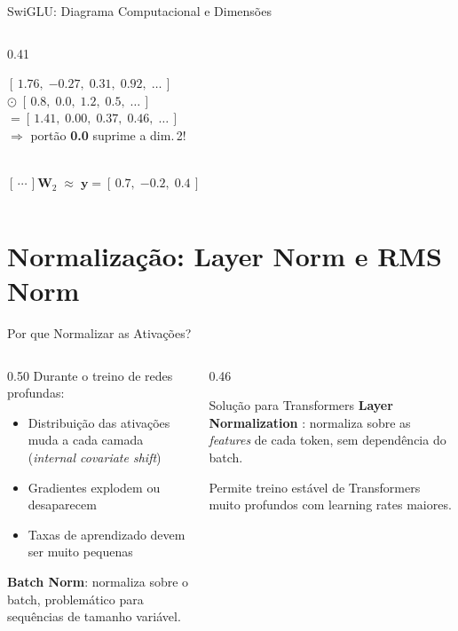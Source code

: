 \documentclass[aspectratio=169, xcolor=dvipsnames]{beamer}
\begin{document}
\begin{frame}{SwiGLU: Diagrama Computacional e Dimensões}
\begin{columns}[T]
\begin{column}{0.41\textwidth}
        \colorbox{PastelOrange}{%
          \begin{minipage}{0.88\linewidth}
            \scriptsize
            $[\,1.76,\;{-0.27},\;0.31,\;0.92,\;\ldots\,]$\\
            $\odot\;[\,0.8,\;\mathbf{0.0},\;1.2,\;0.5,\;\ldots\,]$\\[0.15em]
            $=[\,1.41,\;\mathbf{0.00},\;0.37,\;0.46,\;\ldots\,]$\\[0.2em]
            \textcolor{red!70!black}{\tiny$\Rightarrow$ portão \textbf{0.0} suprime a dim.\,2!}
          \end{minipage}%
        }\\[0.6em]

        {\setlength{\fboxsep}{3pt}%
        \colorbox{CellYellow}{$[\,\cdots\,]\mathbf{W}_2\;\approx\;\mathbf{y} = [\,0.7,\;{-0.2},\;0.4\,]$}
        }
      \end{column}
    \end{columns}
  \end{frame}

  \section{Normalização: Layer Norm e RMS Norm}

  \begin{frame}{Por que Normalizar as Ativações?}
    \begin{columns}[T]
      \begin{column}{0.50\textwidth}
        Durante o treino de redes profundas:
        \begin{itemize}
          \item Distribuição das ativações muda a cada camada (\textit{internal covariate shift})
          \item Gradientes explodem ou desaparecem
          \item Taxas de aprendizado devem ser muito pequenas
        \end{itemize}
        \vspace{0.4em}
        \textbf{Batch Norm}: normaliza sobre o batch, problemático para sequências de tamanho variável.
      \end{column}
      \begin{column}{0.46\textwidth}
        \begin{block}{Solução para Transformers}
          \textbf{Layer Normalization} \cite{ba2016layernorm}: normaliza sobre as \textit{features} de cada token, sem dependência do batch.
        \end{block}
        \vspace{0.3em}
        Permite treino estável de Transformers muito profundos com learning rates maiores.
      \end{column}
    \end{columns}
  \end{frame}
\end{document}
